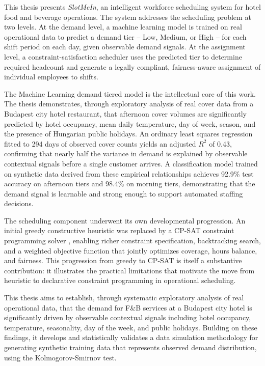 \documentclass[12pt,a4paper,oneside]{article}
\begin{document}
This thesis presents \textit{SlotMeIn}, an intelligent workforce scheduling system for hotel food and beverage operations. The system addresses the scheduling problem at two levels. At the demand level, a machine learning model is trained on real operational data to predict a demand tier -- Low, Medium, or High -- for each shift period on each day, given observable demand signals. At the assignment level, a constraint-satisfaction scheduler uses the predicted tier to determine required headcount and generate a legally compliant, fairness-aware assignment of individual employees to shifts.

The Machine Learning demand tiered model is the intellectual core of this work. The thesis demonstrates, through exploratory analysis of real cover data from a Budapest city hotel restaurant, that afternoon cover volumes are significantly predicted by hotel occupancy, mean daily temperature, day of week, season, and the presence of Hungarian public holidays. An ordinary least squares regression fitted to 294 days of observed cover counts yields an adjusted $R^2$ of 0.43, confirming that nearly half the variance in demand is explained by observable contextual signals before a single customer arrives. A classification model trained on synthetic data derived from these empirical relationships achieves 92.9\% test accuracy on afternoon tiers and 98.4\% on morning tiers, demonstrating that the demand signal is learnable and strong enough to support automated staffing decisions.

The scheduling component underwent its own developmental progression. An initial greedy constructive heuristic was replaced by a CP-SAT constraint programming solver \citep{ortools2024}, enabling richer constraint specification, backtracking search, and a weighted objective function that jointly optimizes coverage, hours balance, and fairness. This progression from greedy to CP-SAT is itself a substantive contribution: it illustrates the practical limitations that motivate the move from heuristic to declarative constraint programming in operational scheduling.

This thesis aims to establish, through systematic exploratory analysis of real operational data, that the demand for F&B services at a Budapest city hotel is significantly driven by observable contextual signals including hotel occupancy, temperature, seasonality, day of the week, and public holidays.  Building on these findings, it develops and statistically validates a data simulation methodology for generating synthetic training data that represents observed demand distribution, using the Kolmogorov-Smirnov test.
\end{document}
